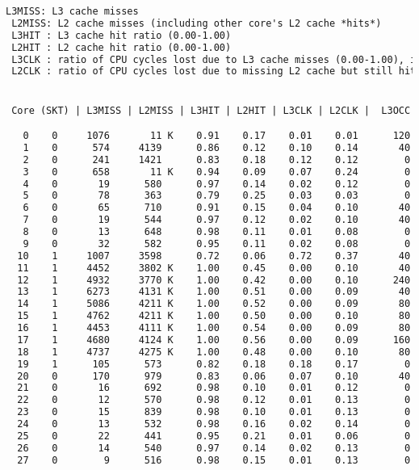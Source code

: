 \begin{lstlisting}[language=TeX]
 L3MISS: L3 cache misses 
 L2MISS: L2 cache misses (including other core's L2 cache *hits*) 
 L3HIT : L3 cache hit ratio (0.00-1.00)
 L2HIT : L2 cache hit ratio (0.00-1.00)
 L3CLK : ratio of CPU cycles lost due to L3 cache misses (0.00-1.00), in some cases could be >1.0 due to a higher memory latency
 L2CLK : ratio of CPU cycles lost due to missing L2 cache but still hitting L3 cache (0.00-1.00)


 Core (SKT) | L3MISS | L2MISS | L3HIT | L2HIT | L3CLK | L2CLK |  L3OCC

   0    0     1076       11 K    0.91    0.17    0.01    0.01      120
   1    0      574     4139      0.86    0.12    0.10    0.14       40
   2    0      241     1421      0.83    0.18    0.12    0.12        0
   3    0      658       11 K    0.94    0.09    0.07    0.24        0
   4    0       19      580      0.97    0.14    0.02    0.12        0
   5    0       78      363      0.79    0.25    0.03    0.03        0
   6    0       65      710      0.91    0.15    0.04    0.10       40
   7    0       19      544      0.97    0.12    0.02    0.10       40
   8    0       13      648      0.98    0.11    0.01    0.08        0
   9    0       32      582      0.95    0.11    0.02    0.08        0
  10    1     1007     3598      0.72    0.06    0.72    0.37       40
  11    1     4452     3802 K    1.00    0.45    0.00    0.10       40
  12    1     4932     3770 K    1.00    0.42    0.00    0.10      240
  13    1     6273     4131 K    1.00    0.51    0.00    0.09       40
  14    1     5086     4211 K    1.00    0.52    0.00    0.09       80
  15    1     4762     4211 K    1.00    0.50    0.00    0.10       80
  16    1     4453     4111 K    1.00    0.54    0.00    0.09       80
  17    1     4680     4124 K    1.00    0.56    0.00    0.09      160
  18    1     4737     4275 K    1.00    0.48    0.00    0.10       80
  19    1      105      573      0.82    0.18    0.18    0.17        0
  20    0      170      979      0.83    0.06    0.07    0.10       40
  21    0       16      692      0.98    0.10    0.01    0.12        0
  22    0       12      570      0.98    0.12    0.01    0.13        0
  23    0       15      839      0.98    0.10    0.01    0.13        0
  24    0       13      532      0.98    0.16    0.02    0.14        0
  25    0       22      441      0.95    0.21    0.01    0.06        0
  26    0       14      540      0.97    0.14    0.02    0.13        0
  27    0        9      516      0.98    0.15    0.01    0.13        0

\end{lstlisting}
